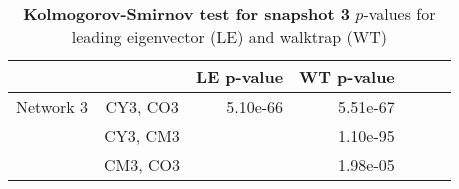\begin{table}
\centering
\caption[Kolmogorov-Smirnov test for snapshot 3]{\textbf{Kolmogorov-Smirnov test for snapshot 3} $p$-values for leading eigenvector (LE) and walktrap (WT)}
\label{tab:n3-pvalues2}
\vspace*{5mm}
\begin{tabular}{lcrrrrr}
	\toprule

	\rowcolor{Gray}
	 & & LE p-value & WT p-value\\
	\midrule 
	\quad Network 3     & CY3, CO3 & 5.10e-66 & 5.51e-67\\
					    & CY3, CM3 &          & 1.10e-95\\
						& CM3, CO3 &          & 1.98e-05\\ 
	\bottomrule
\end{tabular}
\end{table}
